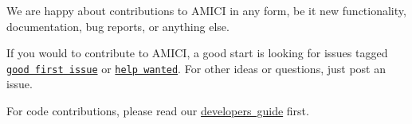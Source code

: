 We are happy about contributions to A\+M\+I\+CI in any form, be it new functionality, documentation, bug reports, or anything else.

If you would to contribute to A\+M\+I\+CI, a good start is looking for issues tagged \href{https://github.com/AMICI-dev/AMICI/issues?q=is\%3Aissue+is\%3Aopen+label\%3A\%22good+first+issue\%22}{\texttt{ {\ttfamily good first issue}}} or \href{https://github.com/AMICI-dev/AMICI/issues?q=is\%3Aissue+is\%3Aopen+label\%3A\%22help+wanted\%22}{\texttt{ {\ttfamily help wanted}}}. For other ideas or questions, just post an issue.

For code contributions, please read our \mbox{\hyperlink{md_documentation_development}{developer\textquotesingle{}s guide}} first. 